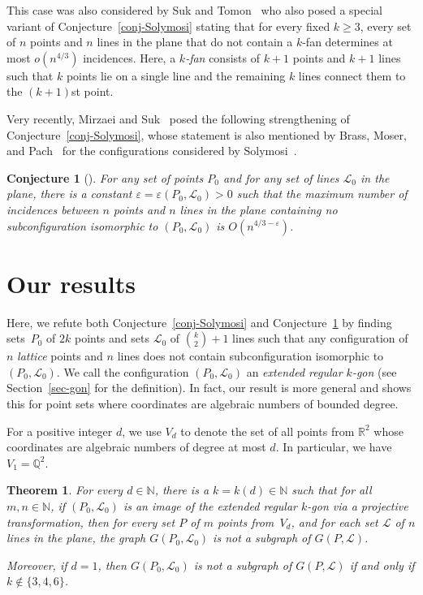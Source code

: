 \documentclass{article}
\newtheorem{theorem}{Theorem}
\newtheorem{conjecture}{Conjecture}
\begin{document}
This case was also considered by Suk and Tomon~\cite{tomSuk21} who also posed a special variant of Conjecture~\ref{conj-Solymosi} stating that for every fixed $k \geq 3$, every set of $n$ points and $n$ lines in the plane that do not contain a $k$-fan determines at most $o(n^{4/3})$ incidences.
Here, a \emph{$k$-fan} consists of $k+1$ points and $k+1$ lines such that $k$ points lie on a single line and the remaining $k$ lines connect them to the $(k+1)$st point.

Very recently, Mirzaei and Suk~\cite{mirSuk21} posed the following strengthening of Conjecture~\ref{conj-Solymosi}, whose statement is also mentioned by Brass, Moser, and Pach~\cite[p.~291]{bmp05}  for the configurations considered by Solymosi~\cite{solymosi06}.

\begin{conjecture}[\cite{mirSuk21}]
\label{conj-Suk}
For any set of points $P_0$ and for any set of lines $\mathcal{L}_0$ in the plane, there is a constant $\varepsilon = \varepsilon(P_0,\mathcal{L}_0)>0$ such that the maximum number of incidences between $n$ points and $n$ lines in the plane containing no subconfiguration isomorphic to $(P_0,\mathcal{L}_0)$ is $O(n^{4/3-\varepsilon})$.
\end{conjecture}



\section{Our results}

Here, we refute both Conjecture~\ref{conj-Solymosi} and Conjecture~\ref{conj-Suk} by finding sets~$P_0$ of $2k$ points and sets $\mathcal{L}_0$ of $\binom{k}{2}+1$ lines such that any configuration of $n$ \emph{lattice} points and $n$ lines does not contain subconfiguration isomorphic to $(P_0,\mathcal{L}_0)$.
We call the configuration $(P_0,\mathcal{L}_0)$ an \emph{extended regular $k$-gon} (see Section~\ref{sec-gon} for the definition).
In fact, our result is more general and shows this for point sets where coordinates are algebraic numbers of bounded degree.

For a positive integer $d$, we use $V_d$ to denote the set of all points from $\mathbb{R}^2$ whose coordinates are algebraic numbers of degree at most $d$.
In particular, we have $V_1=\mathbb{Q}^2$.


\begin{theorem}
\label{thm-counterexample}
For every $d \in \mathbb{N}$, there is a $k=k(d) \in \mathbb{N}$ such that for all $m,n \in \mathbb{N}$, if $(P_0,\mathcal{L}_0)$ is an image of the extended regular $k$-gon via a projective transformation, then for every set $P$ of $m$ points from~$V_d$, and for each set $\mathcal{L}$ of $n$ lines in the plane, the graph $G(P_0,\mathcal{L}_0)$ is not a subgraph of $G(P,\mathcal{L})$.

Moreover, if $d=1$, then $G(P_0,\mathcal{L}_0)$ is not a subgraph of $G(P,\mathcal{L})$ if and only if $k \notin \{3,4,6\}$.
\end{theorem}
\end{document}
